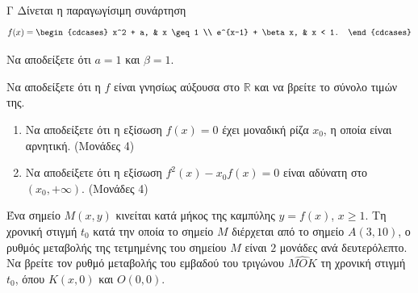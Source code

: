 \begin{thema}{Γ}
Δίνεται η παραγωγίσιμη συνάρτηση
\[
f(x) = \begin{cdcases} x^2 + a, & x \geq 1 \\ e^{x-1} + \beta x, & x < 1. \end{cdcases}
\]
\begin{erwthma}
    \item Να αποδείξετε ότι $a = 1$ και $\beta = 1$. 

    \item Να αποδείξετε ότι η $f$ είναι γνησίως αύξουσα στο $\mathbb{R}$ και να βρείτε το σύνολο τιμών της. 

    \item
    \begin{enumerate}[label=\roman*.]
        \item Να αποδείξετε ότι η εξίσωση $f(x) = 0$ έχει μοναδική ρίζα $x_0$, η οποία είναι αρνητική. \hfill(Μονάδες 4)
        \item Να αποδείξετε ότι η εξίσωση $f^2(x) - x_0 f(x) = 0$ είναι αδύνατη στο $(x_0, +\infty)$. \hfill(Μονάδες 4)
    \end{enumerate}

    \item Ένα σημείο $M(x,y)$ κινείται κατά μήκος της καμπύλης $y = f(x)$, $x \geq 1$. Τη χρονική στιγμή $t_0$ κατά την οποία το σημείο $M$ διέρχεται από το σημείο $A(3, 10)$, ο ρυθμός μεταβολής της τετμημένης του σημείου $M$ είναι $2$ μονάδες ανά δευτερόλεπτο. Να βρείτε τον ρυθμό μεταβολής του εμβαδού του τριγώνου $\widehat{MOK}$ τη χρονική στιγμή $t_0$, όπου $K(x, 0)$ και $O(0, 0)$. 
\end{erwthma}
\end{thema}

